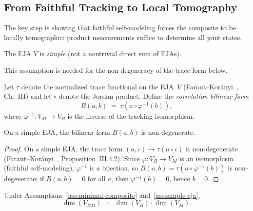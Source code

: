 \subsection{From Faithful Tracking to Local
Tomography}\label{subsec:lt-proof}

The key step is showing that faithful self-modeling forces the composite
to be locally tomographic: product measurements suffice to determine all
joint states.

\begin{assumption}\label{ass:simple-eja}
The EJA $V$ is \emph{simple} (not a nontrivial direct sum of EJAs).
\end{assumption}

This assumption is needed for the non-degeneracy of the trace form below.

\begin{definition}\label{def:corr-form}
Let $\tau$ denote the normalized trace functional on the EJA~$V$
(Faraut--Kor\'anyi~\cite{FarautKoranyi1994}, Ch.~III) and let $\circ$
denote the Jordan product. Define the \emph{correlation bilinear form}
\begin{equation}\label{eq:corr-form}
  B(a,b) \;=\; \tau\!\left(a \circ \varphi^{-1}(b)\right),
\end{equation}
where $\varphi^{-1} \colon V_M \to V_B$ is the inverse of the tracking
isomorphism.
\end{definition}

\begin{proposition}\label{prop:nondeg}
On a simple EJA, the bilinear form $B(a,b)$ is non-degenerate.
\end{proposition}

\begin{proof}
On a simple EJA, the trace form $(a,c) \mapsto \tau(a\circ c)$ is
non-degenerate (Faraut--Kor\'anyi~\cite{FarautKoranyi1994},
Proposition~III.4.2). Since $\varphi\colon V_B\to V_M$ is an
isomorphism (faithful self-modeling), $\varphi^{-1}$ is a bijection,
so $B(a,b) = \tau(a\circ\varphi^{-1}(b))$ is non-degenerate: if
$B(a,b) = 0$ for all $a$, then $\varphi^{-1}(b) = 0$, hence $b=0$.
\end{proof}

\begin{theorem}\label{thm:local-tomo}
Under Assumptions~\ref{ass:minimal-composite} and~\ref{ass:simple-eja},
\[
  \dim(V_{BM}) \;=\; \dim(V_B)\cdot\dim(V_M).
\]
\end{theorem}


